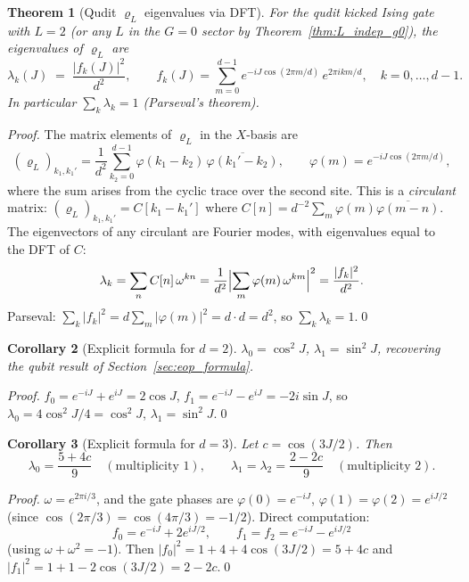 \documentclass[12pt,a4paper]{article}
\newtheorem{theorem}{Theorem}[section]
\newtheorem{corollary}[theorem]{Corollary}
\begin{document}
\begin{theorem}[Qudit $\varrho_{L}$ eigenvalues via DFT]\label{thm:rhol_qudit}
For the qudit kicked Ising gate with $L=2$ (or any $L$ in the
$G=0$ sector by Theorem~\ref{thm:L_indep_g0}), the eigenvalues of $\varrho_{L}$
are
\[
  \boxed{\lambda_{k}(J) \;=\; \frac{|f_{k}(J)|^{2}}{d^{2}},
  \qquad
  f_{k}(J) = \sum_{m=0}^{d-1}
  e^{-iJ\cos(2\pi m/d)}\,e^{2\pi i km/d},}
  \quad k=0,\ldots,d{-}1.
\]
In particular $\sum_{k}\lambda_{k}=1$ (Parseval's theorem).
\end{theorem}

\begin{proof}
The matrix elements of $\varrho_{L}$ in the $X$-basis are
\[
  (\varrho_{L})_{k_{1},k_{1}'} = \frac{1}{d^{2}}\sum_{k_{2}=0}^{d-1}
  \varphi(k_{1}-k_{2})\,\overline{\varphi(k_{1}'-k_{2})},
  \qquad
  \varphi(m) = e^{-iJ\cos(2\pi m/d)},
\]
where the sum arises from the cyclic trace over the second site.
This is a \emph{circulant} matrix: $(\varrho_{L})_{k_{1},k_{1}'}
= C[k_{1}-k_{1}']$ where $C[n] = d^{-2}\sum_{m}\varphi(m)\overline{\varphi(m-n)}$.
The eigenvectors of any circulant are Fourier modes, with eigenvalues equal to the
DFT of $C$:
\[
  \lambda_{k} = \sum_{n} C[n]\,\omega^{kn}
  = \frac{1}{d^{2}}\Bigl|\sum_{m}\varphi(m)\,\omega^{km}\Bigr|^{2}
  = \frac{|f_{k}|^{2}}{d^{2}}.
\]
Parseval: $\sum_{k}|f_{k}|^{2} = d\sum_{m}|\varphi(m)|^{2} = d\cdot d = d^{2}$,
so $\sum_{k}\lambda_{k}=1$.\qed
\end{proof}

\begin{corollary}[Explicit formula for $d=2$]\label{cor:rhol_d2}
$\lambda_{0}=\cos^{2}\!J$, $\lambda_{1}=\sin^{2}\!J$,
recovering the qubit result of Section~\ref{sec:eop_formula}.
\end{corollary}

\begin{proof}
$f_{0}=e^{-iJ}+e^{iJ}=2\cos J$, $f_{1}=e^{-iJ}-e^{iJ}=-2i\sin J$, so
$\lambda_{0}=4\cos^{2}\!J/4=\cos^{2}\!J$, $\lambda_{1}=\sin^{2}\!J$.\qed
\end{proof}

\begin{corollary}[Explicit formula for $d=3$]\label{cor:rhol_d3}
Let $c = \cos(3J/2)$.  Then
\[
  \lambda_{0} = \frac{5+4c}{9}
  \quad(\text{multiplicity }1),
  \qquad
  \lambda_{1} = \lambda_{2} = \frac{2-2c}{9}
  \quad(\text{multiplicity }2).
\]
\end{corollary}

\begin{proof}
$\omega=e^{2\pi i/3}$, and the gate phases are
$\varphi(0)=e^{-iJ}$, $\varphi(1)=\varphi(2)=e^{iJ/2}$
(since $\cos(2\pi/3)=\cos(4\pi/3)=-1/2$).
Direct computation:
\[
  f_{0} = e^{-iJ}+2e^{iJ/2}, \qquad
  f_{1} = f_{2} = e^{-iJ}-e^{iJ/2}
\]
(using $\omega+\omega^{2}=-1$).  Then
$|f_{0}|^{2}=1+4+4\cos(3J/2)=5+4c$ and
$|f_{1}|^{2}=1+1-2\cos(3J/2)=2-2c$.\qed
\end{proof}
\end{document}
